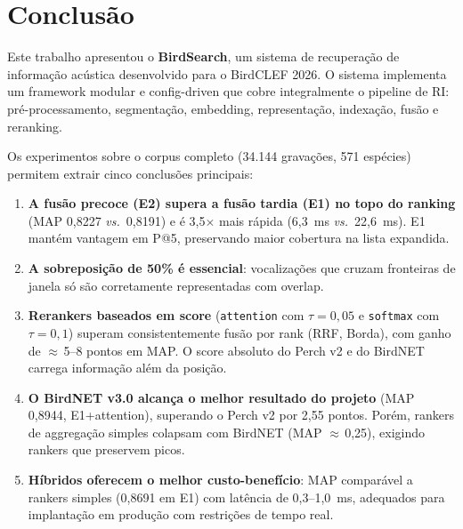 \documentclass[12pt,a4paper]{article}
\begin{document}
\section{Conclusão}
\label{sec:conclusao}

Este trabalho apresentou o \textbf{BirdSearch}, um sistema de recuperação de
informação acústica desenvolvido para o BirdCLEF 2026. O sistema implementa
um framework modular e config-driven que cobre integralmente o pipeline de RI:
pré-processamento, segmentação, embedding, representação, indexação, fusão e
reranking.

Os experimentos sobre o corpus completo (34.144 gravações, 571 espécies)
permitem extrair cinco conclusões principais:

\begin{enumerate}
  \item \textbf{A fusão precoce (E2) supera a fusão tardia (E1) no topo do
  ranking} (MAP 0,8227 \emph{vs.}\ 0,8191) e é 3,5$\times$ mais rápida (6,3~ms
  \emph{vs.}\ 22,6~ms). E1 mantém vantagem em P@5, preservando maior cobertura
  na lista expandida.

  \item \textbf{A sobreposição de 50\% é essencial}: vocalizações que cruzam
  fronteiras de janela só são corretamente representadas com overlap.

  \item \textbf{Rerankers baseados em score} (\texttt{attention} com $\tau=0{,}05$
  e \texttt{softmax} com $\tau=0{,}1$) superam consistentemente fusão por rank
  (RRF, Borda), com ganho de $\approx$\,5--8 pontos em MAP. O score absoluto do
  Perch v2 e do BirdNET carrega informação além da posição.

  \item \textbf{O BirdNET v3.0 alcança o melhor resultado do projeto}
  (MAP 0,8944, E1+attention), superando o Perch v2 por 2,55 pontos. Porém,
  rankers de aggregação simples colapsam com BirdNET (MAP $\approx$\,0,25),
  exigindo rankers que preservem picos.

  \item \textbf{Híbridos oferecem o melhor custo-benefício}: MAP comparável
  a rankers simples (0,8691 em E1) com latência de 0,3--1,0~ms, adequados para
  implantação em produção com restrições de tempo real.
\end{enumerate}
\end{document}
